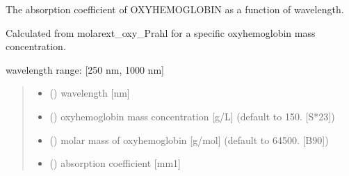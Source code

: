\documentclass[letterpaper,10pt,english]{sphinxmanual}
\begin{document}
\begin{fulllineitems}
\label{\detokenize{03_absorption_coefficient:skinoptics.absorption_coefficient.mua_oxy_Prahl}}
\pysigstartsignatures
{}
\pysigstopsignatures
\begin{DUlineblock}{0em}
\item[] The absorption coefficient of OXY\sphinxhyphen{}HEMOGLOBIN as a function of wavelength.
\item[] Calculated from molarext\_oxy\_Prahl for a specific oxy\sphinxhyphen{}hemoglobin mass concentration.
\end{DUlineblock}

\begin{DUlineblock}{0em}
\item[] wavelength range: {[}250 nm, 1000 nm{]}
\end{DUlineblock}
\begin{quote}\begin{description}
\begin{itemize}
\item {} 
\sphinxAtStartPar
{} () \textendash{} wavelength {[}nm{]}

\item {} 
\sphinxAtStartPar
{} () \textendash{} oxy\sphinxhyphen{}hemoglobin mass concentration {[}g/L{]} (default to 150. {[}S*23{]})

\item {} 
\sphinxAtStartPar
{} () \textendash{} molar mass of oxy\sphinxhyphen{}hemoglobin {[}g/mol{]} (default  to 64500. {[}B90{]})

\end{itemize}

\sphinxAtStartPar
\begin{itemize}
\item {} 
\sphinxAtStartPar
{} () \textendash{} absorption coefficient {[}mm\sphinxhyphen{}1{]}

\end{itemize}


\end{description}\end{quote}

\end{fulllineitems}
\end{document}
